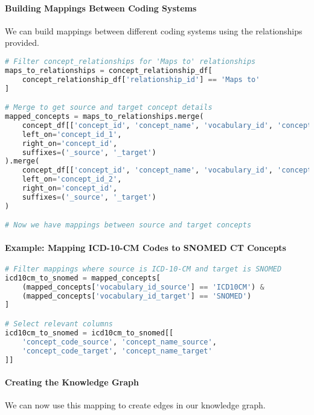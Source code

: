 \documentclass[12pt, a4paper]{article}
\begin{document}
\paragraph{Building Mappings Between Coding Systems}

We can build mappings between different coding systems using the relationships provided.

\begin{lstlisting}[language=Python]
# Filter concept_relationships for 'Maps to' relationships
maps_to_relationships = concept_relationship_df[
    concept_relationship_df['relationship_id'] == 'Maps to'
]

# Merge to get source and target concept details
mapped_concepts = maps_to_relationships.merge(
    concept_df[['concept_id', 'concept_name', 'vocabulary_id', 'concept_code']],
    left_on='concept_id_1',
    right_on='concept_id',
    suffixes=('_source', '_target')
).merge(
    concept_df[['concept_id', 'concept_name', 'vocabulary_id', 'concept_code']],
    left_on='concept_id_2',
    right_on='concept_id',
    suffixes=('_source', '_target')
)

# Now we have mappings between source and target concepts
\end{lstlisting}

\paragraph{Example: Mapping ICD-10-CM Codes to SNOMED CT Concepts}

\begin{lstlisting}[language=Python]
# Filter mappings where source is ICD-10-CM and target is SNOMED
icd10cm_to_snomed = mapped_concepts[
    (mapped_concepts['vocabulary_id_source'] == 'ICD10CM') &
    (mapped_concepts['vocabulary_id_target'] == 'SNOMED')
]

# Select relevant columns
icd10cm_to_snomed = icd10cm_to_snomed[[
    'concept_code_source', 'concept_name_source',
    'concept_code_target', 'concept_name_target'
]]
\end{lstlisting}

\paragraph{Creating the Knowledge Graph}

We can now use this mapping to create edges in our knowledge graph.
\end{document}
